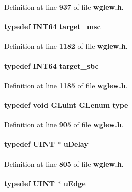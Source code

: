 Definition at line {\bf 937} of file {\bf wglew.\+h}.

\paragraph[{target\+\_\+msc}]{\setlength{\rightskip}{0pt plus 5cm}typedef {\bf I\+N\+T64} {\bf target\+\_\+msc}}\label{wglew_8h_a9c267838ba784fae2da343628260bf77}


Definition at line {\bf 1182} of file {\bf wglew.\+h}.

\paragraph[{target\+\_\+sbc}]{\setlength{\rightskip}{0pt plus 5cm}typedef {\bf I\+N\+T64} {\bf target\+\_\+sbc}}\label{wglew_8h_a803ea7cb0dc5a61d3cff625e086fc8be}


Definition at line {\bf 1185} of file {\bf wglew.\+h}.

\paragraph[{type}]{\setlength{\rightskip}{0pt plus 5cm}typedef {\bf void} {\bf G\+Luint} {\bf G\+Lenum} {\bf type}}\label{wglew_8h_adef6e62b57cfeb2a6221fa6bc6c311a3}


Definition at line {\bf 905} of file {\bf wglew.\+h}.

\paragraph[{u\+Delay}]{\setlength{\rightskip}{0pt plus 5cm}typedef {\bf U\+I\+NT} $\ast$ {\bf u\+Delay}}\label{wglew_8h_abbf6a4b4dbb8b41efa229dd47ea7859a}


Definition at line {\bf 805} of file {\bf wglew.\+h}.

\paragraph[{u\+Edge}]{\setlength{\rightskip}{0pt plus 5cm}typedef {\bf U\+I\+NT} $\ast$ {\bf u\+Edge}}\label{wglew_8h_a81bba31b9300df9f7bb4011039093fd5}


